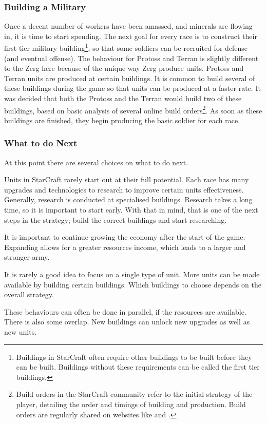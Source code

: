 \documentclass[11pt,openright,a4paper]{report}
\begin{document}
\subsubsection{Building a Military}
Once a decent number of workers have been amassed, and minerals are flowing in, it is time to start spending. The next goal for every race is to construct their first tier military building\footnote{Buildings in StarCraft often require other buildings to be built before they can be built. Buildings without these requirements can be called the first tier buildings.}, so that some soldiers can be recruited for defense (and eventual offense). The behaviour for Protoss and Terran is slightly different to the Zerg here because of the unique way Zerg produce units. Protoss and Terran units are produced at certain buildings. It is common to build several of these buildings during the game so that units can be produced at a faster rate. It was decided that both the Protoss and the Terran would build two of these buildings, based on basic analysis of several online build orders\footnote{Build orders in the StarCraft community refer to the initial strategy of the player, detailing the order and timings of building and production. Build orders are regularly shared on websites like  and .}. As soon as these buildings are finished, they begin producing the basic soldier for each race.

\subsubsection{What to do Next}
At this point there are several choices on what to do next.
\begin{description}[leftmargin=1.5cm,labelindent=1cm]
\item[Research upgrades]{Units in StarCraft rarely start out at their full potential. Each race has many upgrades and technologies to research to improve certain units effectiveness. Generally, research is conducted at specialised buildings. Research takes a long time, so it is important to start early. With that in mind, that is one of the next steps in the strategy; build the correct buildings and start researching.}
\item[Expand to new bases]{It is important to continue growing the economy after the start of the game. Expanding allows for a greater resources income, which leads to a larger and stronger army.}
\item[Produce different units]{It is rarely a good idea to focus on a single type of unit. More units can be made available by building certain buildings. Which buildings to choose depends on the overall strategy.}
\end{description}
These behaviours can often be done in parallel, if the resources are available. There is also some overlap. New buildings can unlock new upgrades as well as new units.
\end{document}
